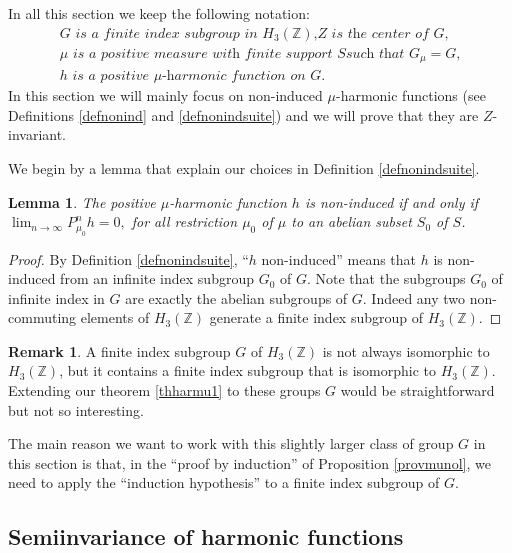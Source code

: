 \documentclass[JEP,XML,SOM,Unicode]{cedram}
\newtheorem{Lem}[Thm]{Lemma}
\theoremstyle{definition}
\newtheorem{Rem}[Thm]{Remark}
\newcommand{\m}[1]{\mathbb{ #1}}
\let\ra\to
\begin{document}
In all this section we keep the following notation:
\begin{equation}
\label{eqnnotsta}
\begin{array}{l}
\textit{$G$ is a finite index subgroup in $H_3(\m Z)$,
$Z$ is the center of $G$,}\\
\textit{$\mu$ is a positive measure with finite support $S$
such that $G_\mu=G$,}\\
\textit{$h$ is a positive $\mu$-harmonic function on $G$.}
\end{array}
\end{equation}
In this section we will mainly focus on non-induced $\mu$-harmonic functions
(see Definitions \ref{defnonind} and \ref{defnonindsuite})
and we will prove that they are $Z$-invariant.

We begin by a lemma that explain our choices in Definition \ref{defnonindsuite}.

\begin{Lem}
\label{lemnonind}
The positive $\mu$-harmonic function $h$ is non-induced if and only if
$\lim_{n\ra\infty}P_{\mu_0}^nh=0,$
for all restriction $\mu_0$ of $\mu$ to an abelian subset $S_0$ of $S$.
\end{Lem}

\begin{proof} By Definition \ref{defnonindsuite}, ``$h$ non-induced'' means that $h$
is non-induced from an infinite index subgroup $G_0$ of $G$.
Note that the subgroups $G_0$ of infinite index in $G$ are exactly
the abelian subgroups of $G$. Indeed any two non-commuting elements of $H_3(\m Z)$
generate a finite index subgroup of $H_3(\m Z)$.
\end{proof}

\begin{Rem}

A finite index subgroup $G$ of $H_3(\m Z)$
is not always isomorphic to $H_3(\m Z)$,
but it contains a finite index subgroup
that is isomorphic to $H_3(\m Z)$.
Extending our theorem \ref{thharmu1} to these groups $G$
would be straightforward but not so interesting.

The main reason we want to work with this slightly larger class of group $G$
in this section
is that, in the ``proof by induction'' of Proposition \ref{provmunol},
we need to apply
the ``induction hypothesis'' to a finite index subgroup of $G$.
\end{Rem}

\subsection{Semiinvariance of harmonic functions}
\label{secseminv}
\end{document}
